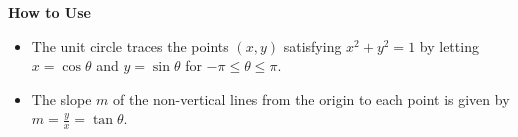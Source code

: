 \documentclass{article}
\begin{document}
\begin{center}
\end{center}

\noindent\textbf{How to Use}

\begin{itemize}
\item
The unit circle traces the points \((x,y)\)
satisfying \(x^2+y^2=1\) by letting
\(x=\cos\theta\) and \(y=\sin\theta\) for \(-\pi\leq\theta\leq\pi\).
\item
The slope \(m\) of the non-vertical lines from the origin to each
point is given by \(m=\frac{y}{x}=\tan\theta\).
\end{itemize}
\end{document}
